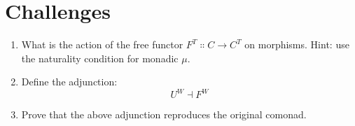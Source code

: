 \section{Challenges}

\begin{enumerate}
  \tightlist
  \item
        What is the action of the free functor
        $F^T \Colon C \to C^T$ on morphisms. Hint: use the
        naturality condition for monadic $\mu$.
  \item
        Define the adjunction:
        \[U^W \dashv F^W\]
  \item
        Prove that the above adjunction reproduces the original comonad.
\end{enumerate}
